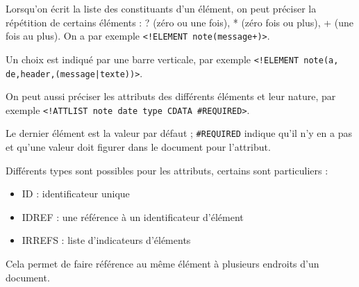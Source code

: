 		Lorsqu'on écrit la liste des constituants d'un élément, on peut préciser la répétition de certains éléments : ? (zéro ou une fois), * (zéro fois ou plus), + (une fois au plus). On a par exemple \texttt{<!ELEMENT note(message+)>}.
		
		Un choix est indiqué par une barre verticale, par exemple \texttt{<!ELEMENT note(a, de,header,(message|texte))>}.
		
		On peut aussi préciser les attributs des différents éléments et leur nature, par exemple \texttt{<!ATTLIST note date type CDATA \#REQUIRED>}.
		
		Le dernier élément est la valeur par défaut ; \texttt{\#REQUIRED} indique qu'il n'y en a pas et qu'une valeur doit figurer dans le document pour l'attribut.
		
		Différents types sont possibles pour les attributs, certains sont particuliers :
		
		\begin{itemize}
			\item ID : identificateur unique
			\item IDREF : une référence à un identificateur d'élément
			\item IRREFS : liste d'indicateurs d'éléments
		\end{itemize}
		
		Cela permet de faire référence au même élément à plusieurs endroits d'un document.